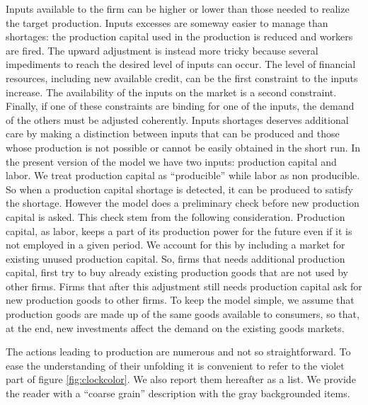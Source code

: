 \documentclass{book}
\begin{document}
Inputs available to the firm can be higher or lower than those needed to realize the target production. Inputs excesses are someway easier to manage than shortages: the production capital used in the production is reduced and workers are fired.
The upward adjustment is instead more tricky because 
several impediments to reach the desired level of inputs can occur.
The level of financial resources, including new available credit, can be the first constraint to the inputs increase. The availability of the inputs on the market is a second constraint. Finally, if one of these constraints are binding for one of the inputs, the demand of the others must be adjusted coherently. Inputs shortages deserves additional care by making a distinction between inputs that can be produced and those whose production is not possible or cannot be easily obtained in the short run. In the present version of the model we have two inputs: production capital and labor. We treat production capital as ``producible'' while labor as non producible. So when a production capital shortage is detected, it can be produced to satisfy the shortage. However the model does a preliminary check before new production capital is asked. This check stem from the following consideration.  
Production capital, as labor, keeps a part of its production power for the future even if it is not employed in a given period. We account for this by including a market for existing unused production capital. So, firms that needs additional production capital, first try to buy already existing production goods that are not used by other firms. Firms that after this adjustment still needs production capital ask for new production goods to other firms. To keep the model simple, we assume that production goods are made up of the same goods available to consumers, so that, at the end, new investments affect the demand on the existing goods markets.



The actions leading to production are numerous and not so straightforward. To ease the understanding of their unfolding it is convenient to refer to the violet part of figure \ref{fig:clockcolor}. We also report them hereafter as a list. We provide the reader with a ``coarse grain'' description with the gray backgrounded items.
\end{document}
